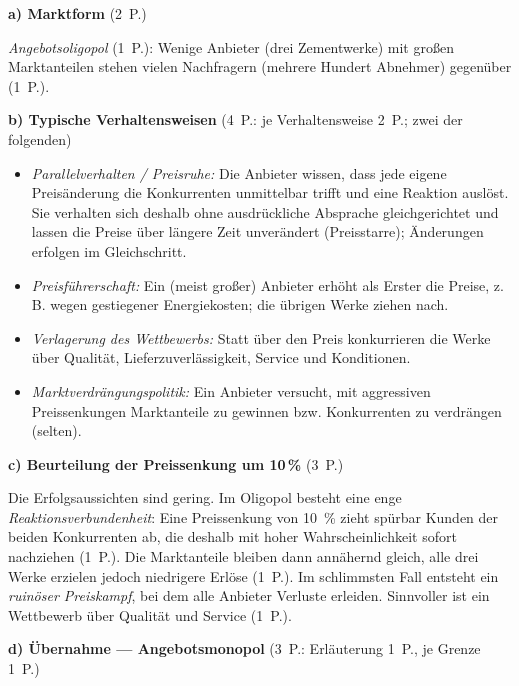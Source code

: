 \begin{loesung}[title={Lösung Aufgabe~1.8 --- Preisbildung im Oligopol und im Monopol}]
\textbf{a) Marktform} \hfill (2~P.)

\emph{Angebotsoligopol} (1~P.): Wenige Anbieter (drei Zementwerke) mit großen
Marktanteilen stehen vielen Nachfragern (mehrere Hundert Abnehmer) gegenüber (1~P.).

\textbf{b) Typische Verhaltensweisen} \hfill (4~P.: je Verhaltensweise 2~P.; zwei der
folgenden)
\begin{itemize}
  \item \emph{Parallelverhalten / Preisruhe:} Die Anbieter wissen, dass jede eigene
    Preisänderung die Konkurrenten unmittelbar trifft und eine Reaktion auslöst. Sie
    verhalten sich deshalb ohne ausdrückliche Absprache gleichgerichtet und lassen die
    Preise über längere Zeit unverändert (Preisstarre); Änderungen erfolgen im
    Gleichschritt.
  \item \emph{Preisführerschaft:} Ein (meist großer) Anbieter erhöht als Erster die
    Preise, z.\,B. wegen gestiegener Energiekosten; die übrigen Werke ziehen nach.
  \item \emph{Verlagerung des Wettbewerbs:} Statt über den Preis konkurrieren die Werke
    über Qualität, Lieferzuverlässigkeit, Service und Konditionen.
  \item \emph{Marktverdrängungspolitik:} Ein Anbieter versucht, mit aggressiven
    Preissenkungen Marktanteile zu gewinnen bzw. Konkurrenten zu verdrängen (selten).
\end{itemize}

\textbf{c) Beurteilung der Preissenkung um 10\,\%} \hfill (3~P.)

Die Erfolgsaussichten sind gering. Im Oligopol besteht eine enge
\emph{Reaktionsverbundenheit}: Eine Preissenkung von 10~\% zieht spürbar Kunden der
beiden Konkurrenten ab, die deshalb mit hoher Wahrscheinlichkeit sofort nachziehen
(1~P.). Die Marktanteile bleiben dann annähernd gleich, alle drei Werke erzielen jedoch
niedrigere Erlöse (1~P.). Im schlimmsten Fall entsteht ein \emph{ruinöser Preiskampf},
bei dem alle Anbieter Verluste erleiden. Sinnvoller ist ein Wettbewerb über Qualität und
Service (1~P.).

\textbf{d) Übernahme --- Angebotsmonopol} \hfill (3~P.: Erläuterung 1~P., je Grenze 1~P.)


\end{loesung}
